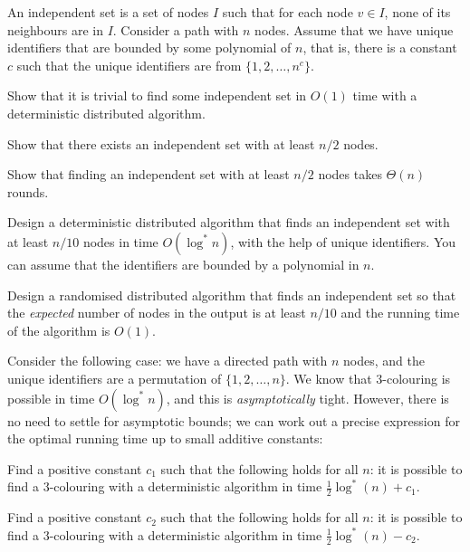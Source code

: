 \begin{ex}
    An independent set is a set of nodes $I$ such that for each node $v \in I$, none of its neighbours are in $I$. Consider a path with $n$ nodes. Assume that we have unique identifiers that are bounded by some polynomial of $n$, that is, there is a constant $c$ such that the unique identifiers are from $\{1,2,\dotsc,n^c\}$.
    \begin{subex}
        \item Show that it is trivial to find some independent set in $O(1)$ time with a deterministic distributed algorithm.
        \item Show that there exists an independent set with at least $n/2$ nodes.
        \item Show that finding an independent set with at least $n/2$ nodes takes $\Theta(n)$ rounds.
        \item Design a deterministic distributed algorithm that finds an independent set with at least $n/10$ nodes in time $O(\log^* n)$, with the help of unique identifiers. You can assume that the identifiers are bounded by a polynomial in $n$.
        \item Design a randomised distributed algorithm that finds an independent set so that the \emph{expected} number of nodes in the output is at least $n/10$ and the running time of the algorithm is $O(1)$.
    \end{subex}
\end{ex}

\begin{ex}
    Consider the following case: we have a directed path with $n$ nodes, and the unique identifiers are a permutation of $\{1,2,\dotsc,n\}$. We know that $3$-colouring is possible in time $O(\log^* n)$, and this is \emph{asymptotically} tight. However, there is no need to settle for asymptotic bounds; we can work out a precise expression for the optimal running time up to small additive constants:
    \begin{subex}
        \item Find a positive constant $c_1$ such that the following holds for all $n$: it is possible to find a $3$-colouring with a deterministic algorithm in time $\frac{1}{2} \log^*(n) + c_1$.
        \item Find a positive constant $c_2$ such that the following holds for all $n$: it is possible to find a $3$-colouring with a deterministic algorithm in time $\frac{1}{2} \log^*(n) - c_2$.
    \end{subex}
\end{ex}
